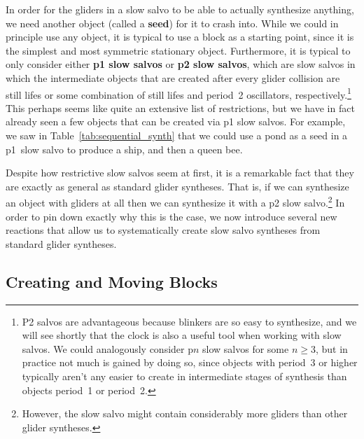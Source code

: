 In order for the gliders in a slow salvo to be able to actually synthesize anything, we need another object (called a \textbf{seed}) for it to crash into. While we could in principle use any object, it is typical to use a block as a starting point, since it is the simplest and most symmetric stationary object. Furthermore, it is typical to only consider either \textbf{p1 slow salvos} or \textbf{p2 slow salvos}, which are slow salvos in which the intermediate objects that are created after every glider collision are still lifes or some combination of still lifes and period~2 oscillators, respectively.\footnote{P2 salvos are advantageous because blinkers are so easy to synthesize, and we will see shortly that the clock is also a useful tool when working with slow salvos. We could analogously consider p$n$ slow salvos for some $n \geq 3$, but in practice not much is gained by doing so, since objects with period~3 or higher typically aren't any easier to create in intermediate stages of synthesis than objects period~1 or period~2.} This perhaps seems like quite an extensive list of restrictions, but we have in fact already seen a few objects that can be created via p1 slow salvos. For example, we saw in Table~\ref{tab:sequential_synth} that we could use a pond as a seed in a p1~slow salvo to produce a ship, and then a queen bee.%

Despite how restrictive slow salvos seem at first, it is a remarkable fact that they are exactly as general as standard glider syntheses. That is, if we can synthesize an object with gliders at all then we can synthesize it with a p2 slow salvo.\footnote{However, the slow salvo might contain considerably more gliders than other glider syntheses.} In order to pin down exactly why this is the case, we now introduce several new reactions that allow us to systematically create slow salvo syntheses from standard glider syntheses.


\subsection{Creating and Moving Blocks}\label{sec:slow_salvo_blocks}

